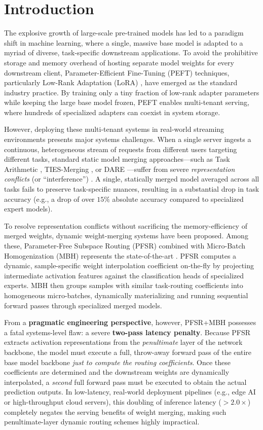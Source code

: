 \section{Introduction}
\label{sec:intro}

The explosive growth of large-scale pre-trained models has led to a paradigm shift in machine learning, where a single, massive base model is adapted to a myriad of diverse, task-specific downstream applications.
To avoid the prohibitive storage and memory overhead of hosting separate model weights for every downstream client, Parameter-Efficient Fine-Tuning (PEFT) techniques, particularly Low-Rank Adaptation (LoRA) \cite{hu21lora}, have emerged as the standard industry practice.
By training only a tiny fraction of low-rank adapter parameters while keeping the large base model frozen, PEFT enables multi-tenant serving, where hundreds of specialized adapters can coexist in system storage.

However, deploying these multi-tenant systems in real-world streaming environments presents major systems challenges.
When a single server ingests a continuous, heterogeneous stream of requests from different users targeting different tasks, standard static model merging approaches---such as Task Arithmetic \cite{ilharco22arithmetic}, TIES-Merging \cite{yadav23ties}, or DARE \cite{yu23dare}---suffer from severe \emph{representation conflicts} (or ``interference'') \cite{yadav23ties}.
A single, statically merged model averaged across all tasks fails to preserve task-specific nuances, resulting in a substantial drop in task accuracy (e.g., a drop of over $15\%$ absolute accuracy compared to specialized expert models).

To resolve representation conflicts without sacrificing the memory-efficiency of merged weights, dynamic weight-merging systems have been proposed.
Among these, Parameter-Free Subspace Routing (PFSR) combined with Micro-Batch Homogenization (MBH) represents the state-of-the-art \cite{chronopoulou23representation}.
PFSR computes a dynamic, sample-specific weight interpolation coefficient on-the-fly by projecting intermediate activation features against the classification heads of specialized experts.
MBH then groups samples with similar task-routing coefficients into homogeneous micro-batches, dynamically materializing and running sequential forward passes through specialized merged models.

From a \textbf{pragmatic engineering perspective}, however, PFSR+MBH possesses a fatal systems-level flaw: a severe \textbf{two-pass latency penalty}.
Because PFSR extracts activation representations from the \emph{penultimate} layer of the network backbone, the model must execute a full, throw-away forward pass of the entire base model backbone \emph{just to compute the routing coefficients}.
Once these coefficients are determined and the downstream weights are dynamically interpolated, a \emph{second} full forward pass must be executed to obtain the actual prediction outputs.
In low-latency, real-world deployment pipelines (e.g., edge AI or high-throughput cloud servers), this doubling of inference latency ($>2.0\times$) completely negates the serving benefits of weight merging, making such penultimate-layer dynamic routing schemes highly impractical.

